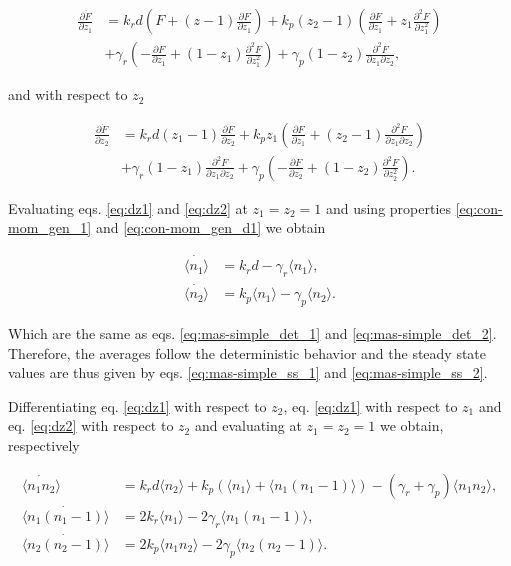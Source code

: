 \begin{equation}
  \label{eq:dz1}
  \begin{split}
    \frac{\partial \dot{F}}{\partial z_1} &= k_rd\left( F+(z-1)\frac{\partial F}{\partial z_1} \right) + k_p(z_2-1) \left( \frac{\partial F}{\partial z_1} + z_1 \frac{\partial^2 F}{\partial z_1^2} \right)\\
    &+\gamma_r\left(-\frac{\partial F}{\partial z_1}+(1-z_1)\frac{\partial^2 F}{\partial z_1^2}\right)+\gamma_p(1-z_2)\frac{\partial^2 F}{\partial z_1 \partial z_2},
  \end{split}
\end{equation}

and with respect to $z_2$

\begin{equation}
  \label{eq:dz2}
  \begin{split}
    \frac{\partial \dot{F}}{\partial z_2}&=k_rd(z_1-1)\frac{\partial F}{\partial z_2} + k_pz_1\left(\frac{\partial F}{\partial z_1} + (z_2-1)\frac{\partial^2 F}{\partial z_1 \partial z_2} \right)\\
    &+ \gamma_r(1-z_1)\frac{\partial^2 F}{\partial z_1 \partial z_2} + \gamma_p\left(-\frac{\partial F}{\partial z_2}+(1-z_2)\frac{\partial^2 F}{\partial z_2^2}\right).
  \end{split}
\end{equation}

Evaluating eqs. \eqref{eq:dz1} and \eqref{eq:dz2} at $z_1 = z_2 = 1$ and using properties \eqref{eq:con-mom_gen_1} and \eqref{eq:con-mom_gen_d1} we obtain

\begin{align*}
\dot{\langle n_1 \rangle}&= k_rd - \gamma_r \langle n_1 \rangle,\\
\dot{\langle n_2 \rangle}&= k_p\langle n_1 \rangle - \gamma_p \langle n_2 \rangle.
\end{align*}

Which are the same as eqs. \eqref{eq:mas-simple_det_1} and \eqref{eq:mas-simple_det_2}. Therefore, the averages follow the deterministic behavior and the steady state values are thus given by eqs. \eqref{eq:mas-simple_ss_1} and \eqref{eq:mas-simple_ss_2}. 

Differentiating eq. \eqref{eq:dz1} with respect to $z_2$, eq. \eqref{eq:dz1} with respect to $z_1$ and eq. \eqref{eq:dz2} with respect to $z_2$ and evaluating at $z_1 = z_2 = 1$ we obtain, respectively

\begin{align}
  \dot{\langle n_1n_2\rangle} &= k_rd\langle n_2 \rangle + k_p\left(\langle n_1\rangle + \langle n_1(n_1-1) \rangle \right) - \left( \gamma_r + \gamma_p \right)\langle n_1n_2 \rangle,\label{eq:dz1z2}\\
  \dot{\langle n_1(n_1-1)\rangle} &= 2k_r\langle n_1\rangle-2\gamma_r\langle n_1(n_1-1) \rangle, \label{eq:dz1z1}\\
  \dot{\langle n_2(n_2-1)\rangle} &= 2k_p\langle n_1n_2 \rangle - 2\gamma_p\langle n_2(n_2-1)\rangle. \label{eq:dz2z2}
\end{align}

